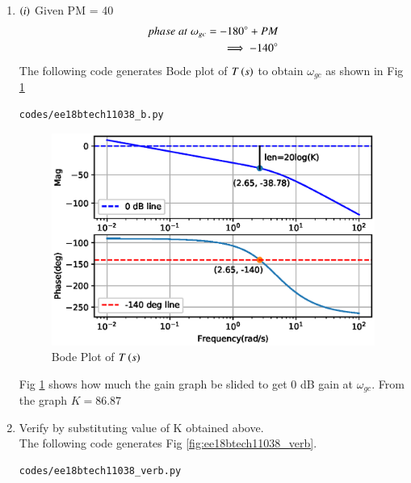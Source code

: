 \begin{enumerate}[label=\thesubsection.\arabic*.,ref=\thesubsection.\theenumi]
\item $\left(i\right)$ Given PM = 40\degree
\\
\solution
\begin{align}
    phase\; at\; \omega_{gc} = -180\degree + PM
    \\
    \implies -140\degree
\end{align}
The following code generates Bode plot of $T\left(s\right)$ to obtain $\omega_{gc}$ as shown in Fig \ref{fig:ee18btech11038_b}

\begin{lstlisting}
codes/ee18btech11038_b.py
\end{lstlisting}

\begin{figure}[!ht]
\centering
\includegraphics[width=\columnwidth]{./figs/ee18btech11038_b.eps}
\caption{Bode Plot of $T\left(s\right)$}
\label{fig:ee18btech11038_b}
\end{figure}
Fig \ref{fig:ee18btech11038_b} shows how much the gain graph be slided to get 0 dB gain at $\omega_{gc}$.
From the graph $K =86.87$ 
\item Verify by substituting value of K obtained above. 
\\
\solution The following code generates Fig \ref{fig:ee18btech11038_verb}.

\begin{lstlisting}
codes/ee18btech11038_verb.py
\end{lstlisting}


\end{enumerate}
